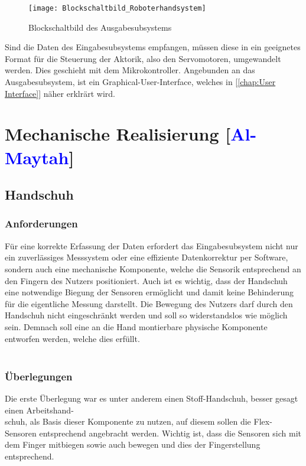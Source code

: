 \documentclass[titlepage,12pt,twoside]{article}
\begin{document}
\begin{figure}[H]
	\begin{center}
		\scalebox{0.8}
		{\texttt{[image: Blockschaltbild\_Roboterhandsystem]}}
		\caption{Blockschaltbild des Ausgabesubsystems}
		\label{fig:Blockschaltbild_Roboterhandsystem}		
	\end{center}
\end{figure}
\hfill \break
Sind die Daten des Eingabesubsystems empfangen, müssen diese in ein geeignetes Format für die Steuerung der Aktorik, also den Servomotoren,
umgewandelt werden. Dies geschieht mit dem Mikrokontroller. Angebunden an das Ausgabesubsystem, ist ein Graphical-User-Interface, 
welches in [\textcolor{blue}{\autoref{chap:User Interface}}] näher erklrärt wird. \\

\newpage
\section{Mechanische Realisierung [\textcolor{blue}{Al-Maytah}]}
\label{chap:Mechanische Realisierung}

\subsection{Handschuh}
\subsubsection{Anforderungen}
Für eine korrekte Erfassung der Daten erfordert das Eingabesubsystem nicht nur ein 
zuverlässiges Messsystem oder eine effiziente Datenkorrektur per Software, 
sondern auch eine mechanische Komponente, welche die Sensorik entsprechend an den 
Fingern des Nutzers positioniert. Auch ist es wichtig, dass der Handschuh eine notwendige Biegung der Sensoren ermöglicht und damit keine Behinderung für die eigentliche Messung darstellt.
Die Bewegung des Nutzers darf durch den Handschuh nicht eingeschränkt werden und soll so widerstandslos wie möglich sein.
Demnach soll eine an die Hand montierbare physische 
Komponente entworfen werden, welche dies erfüllt.
\\
\\
\subsubsection{Überlegungen}
Die erste Überlegung war es unter anderem einen Stoff-Handschuh, besser gesagt einen 
Arbeitshand-\\schuh, als Basis dieser Komponente zu nutzen, auf diesem sollen die 
Flex-Sensoren entsprechend angebracht werden. Wichtig ist, dass die Sensoren sich 
mit dem Finger mitbiegen sowie auch bewegen und dies der Fingerstellung entsprechend. \\
\\
\end{document}
